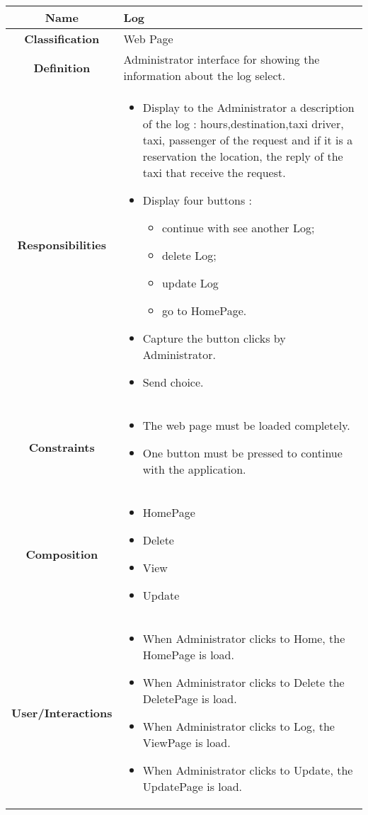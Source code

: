 \documentclass[11pt, a4paper,titlepage]{article}
\begin{document}
\begin{enumerate}
\begin{tabularx}{\textwidth}{| c | X |}
	\hline
	\textbf{Name} & 
	Log
	\\
	\hline
	\textbf{Classification} & 
	Web Page
	\\
	\hline
	\textbf{Definition} & 
     Administrator interface for showing the information about the log select.\\
	\hline
	\textbf{Responsibilities} &
	\begin{itemize}
		\item Display to the Administrator a description of the log : hours,destination,taxi driver, taxi, passenger of the request and if it is a reservation the location, the reply of the taxi that receive the request.
		\item Display four buttons :
		 \begin{itemize}
			\item continue with see another Log;
			\item delete Log;
			\item update Log
			\item go to HomePage.
		\end{itemize}
		\item Capture the button clicks by Administrator.
		\item Send choice.
	\end{itemize}
	\\
	\hline
	\textbf{Constraints} & 
	\begin{itemize}
		\item  The web page must be loaded completely.
		\item One button must be pressed to continue with the application.
	\end{itemize}
	\\
	\hline
	\textbf{Composition} & 
		\begin{itemize}
			\item HomePage
			\item Delete
			\item View
			\item Update
		\end{itemize}
	\\
	\hline
	\textbf{User/Interactions} & 
	\begin{itemize}
		\item When Administrator clicks to Home, the HomePage is load.        
		\item When Administrator clicks to Delete the DeletePage is load.        
		\item When Administrator clicks to Log, the ViewPage is load.
		\item When Administrator clicks to Update, the UpdatePage is load.
	\end{itemize}
	\\
	\hline	
\end{tabularx}


\end{enumerate}
\end{document}
